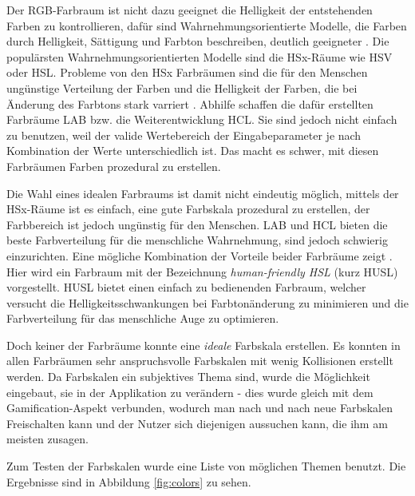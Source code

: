 \documentclass[12pt,twoside]{book}
\begin{document}
Der RGB-Farbraum ist nicht dazu geeignet die Helligkeit der entstehenden Farben zu kontrollieren, dafür sind Wahrnehmungsorientierte Modelle, die Farben durch Helligkeit, Sättigung und Farbton beschreiben, deutlich geeigneter \cite{meier2004interactive}. Die populärsten Wahrnehmungsorientierten Modelle sind die HSx-Räume wie HSV oder HSL.
Probleme von den HSx Farbräumen sind die für den Menschen ungünstige Verteilung der Farben und die Helligkeit der Farben, die bei Änderung des Farbtons stark varriert \cite{husl}.
Abhilfe schaffen die dafür erstellten Farbräume LAB bzw. die Weiterentwicklung HCL. Sie sind jedoch nicht einfach zu benutzen, weil der valide Wertebereich der Eingabeparameter je nach Kombination der Werte unterschiedlich ist. Das macht es schwer, mit diesen Farbräumen Farben prozedural zu erstellen.

Die Wahl eines idealen Farbraums ist damit nicht eindeutig möglich, mittels der HSx-Räume ist es einfach, eine gute Farbskala prozedural zu erstellen, der Farbbereich ist jedoch ungünstig für den Menschen. LAB und HCL bieten die beste Farbverteilung für die menschliche Wahrnehmung, sind jedoch schwierig einzurichten. Eine mögliche Kombination der Vorteile beider Farbräume zeigt \citep{husl}. Hier wird ein Farbraum mit der Bezeichnung \textit{human-friendly HSL} (kurz HUSL) vorgestellt. HUSL bietet einen einfach zu bedienenden Farbraum, welcher versucht die Helligkeitsschwankungen bei Farbtonänderung zu minimieren und die Farbverteilung für das menschliche Auge zu optimieren.

Doch keiner der Farbräume konnte eine \textit{ideale} Farbskala erstellen. Es konnten in allen Farbräumen sehr anspruchsvolle Farbskalen mit wenig Kollisionen erstellt werden. Da Farbskalen ein subjektives Thema sind, wurde die Möglichkeit eingebaut, sie in der Applikation zu verändern - dies wurde gleich mit dem Gamification-Aspekt verbunden, wodurch man nach und nach neue Farbskalen Freischalten kann und der Nutzer sich diejenigen aussuchen kann, die ihm am meisten zusagen.

Zum Testen der Farbskalen wurde eine Liste von möglichen Themen benutzt. Die Ergebnisse sind in Abbildung \ref{fig:colors} zu sehen.
\end{document}

